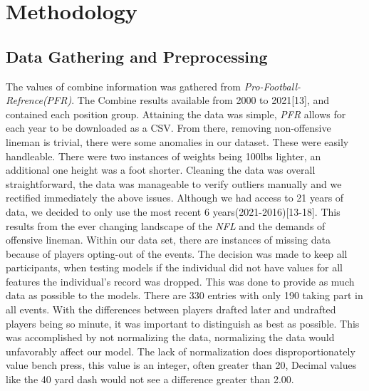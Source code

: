 \documentclass[confrence]{IEEEtran}
\begin{document}
\section*{Methodology}
\subsection*{Data Gathering and Preprocessing}
The values of combine information was gathered from \textit{Pro-Football-Refrence(PFR)}.
The Combine results available from 2000 to 2021[13], and contained each position group.
Attaining the data was simple, \textit{PFR} allows for each year to be downloaded as a CSV.
From there, removing non-offensive lineman is trivial, there were some anomalies in our dataset.
These were easily handleable. There were two instances of weights being 100lbs lighter, an additional one height was a foot shorter.
Cleaning the data was overall straightforward, the data was manageable to verify outliers manually and we rectified immediately the above issues.
Although we had access to 21 years of data, we decided to only use the most recent 6 years(2021-2016)[13-18]. This results from the ever changing landscape of the \textit{NFL} and the demands of offensive lineman.
Within our data set, there are instances of missing data because of players opting-out of the events.
The decision was made to keep all participants, when testing models if the individual did not have values for all features the individual's record was dropped.
This was done to provide as much data as possible to the models. There are 330 entries with only 190 taking part in all events.
With the differences between players drafted later and undrafted players being so minute, it was important to distinguish as best as possible.
This was accomplished by not normalizing the data, normalizing the data would unfavorably affect our model.
The lack of normalization does disproportionately value bench press, this value is an integer, often greater than 20, Decimal values like the 40 yard dash would not see a difference greater than 2.00.
\end{document}
